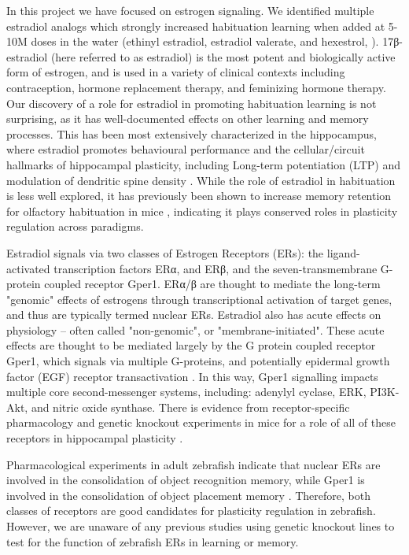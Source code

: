 \documentclass[10pt,lineno]{RandlettLab_elife}
\begin{document}
In this project we have focused on estrogen signaling. 
We identified multiple estradiol analogs which strongly increased habituation learning when added at 5-10\textmu M doses in the water (ethinyl estradiol, estradiol valerate, and hexestrol, \citealp{Lamire2023-he}).
17β-estradiol (here referred to as estradiol) is the most potent and biologically active form of estrogen, and is used in a variety of clinical contexts including contraception, hormone replacement therapy, and feminizing hormone therapy. 
Our discovery of a role for estradiol in promoting habituation learning is not surprising, as it has well-documented effects on other learning and memory processes. 
This has been most extensively characterized in the hippocampus, where estradiol promotes behavioural performance and the cellular/circuit hallmarks of hippocampal plasticity, including Long-term potentiation (LTP) and modulation of dendritic spine density \citep{Iqbal2024-yo, Luine2014-cj, Finney2020-ng, Nilsson2002-as}. 
While the role of estradiol in habituation is less well explored, it has previously been shown to increase memory retention for olfactory habituation in mice \citep{Dillon2013-rk}, indicating it plays conserved roles in plasticity regulation across paradigms.

Estradiol signals via two classes of Estrogen Receptors (ERs): the ligand-activated transcription factors ERα, and ERβ, and the seven-transmembrane G-protein coupled receptor Gper1.
ERα/β are thought to mediate the long-term "genomic" effects of estrogens through transcriptional activation of target genes, and thus are typically termed nuclear ERs.
Estradiol also has acute effects on physiology -- often called "non-genomic", or "membrane-initiated". 
These acute effects are thought to be mediated largely by the G protein coupled receptor Gper1, which signals via multiple G-proteins, and potentially epidermal growth factor (EGF) receptor transactivation \citep{Prossnitz2023-uo, Revankar2005-ww, Filardo2000-yz}.
In this way, Gper1 signalling impacts multiple core second-messenger systems, including: adenylyl cyclase, ERK, PI3K-Akt, and nitric oxide synthase. 
There is evidence from receptor-specific pharmacology and genetic knockout experiments in mice for a role of all of these receptors in hippocampal plasticity \citep{Finney2020-ng, Koitmae2023-vm, Briz2015-yt}. 

Pharmacological experiments in adult zebrafish indicate that nuclear ERs are involved in the consolidation of object recognition memory, while Gper1 is involved in the consolidation of object placement memory \citep{Naderi2020-cg}. 
Therefore, both classes of receptors are good candidates for plasticity regulation in zebrafish. However, we are unaware of any previous studies using genetic knockout lines to test for the function of zebrafish ERs in learning or memory. 
\end{document}
